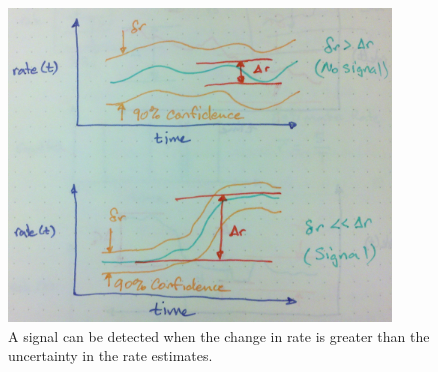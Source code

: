 \documentclass{article}
\begin{document}
%
\begin{figure}[h]
    \centering
    \includegraphics[width=4.0in]{./imgs/signal.jpg}
        \caption{A signal can be detected when the change in rate is greater than the uncertainty in the rate estimates.}
    \label{fig:signal}
\end{figure}
%
%
\end{document}
